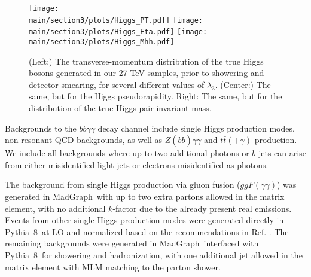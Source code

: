 \begin{figure}[h]
\centering
	\texttt{[image: \\main/section3/plots/Higgs\_PT.pdf]}
	\hfill
	\texttt{[image: \\main/section3/plots/Higgs\_Eta.pdf]}
	\hfill
	\texttt{[image: \\main/section3/plots/Higgs\_Mhh.pdf]}
\caption{(Left:) The transverse-momentum distribution of the true Higgs bosons generated in our 27 TeV samples, prior to showering and detector smearing, for several different values of $\lambda_3$. (Center:) The same, but for the Higgs pseudorapidity. Right: The same, but for the distribution of the true Higgs pair invariant mass.}\label{fig:dihiggs_kinematics}
\end{figure}

Backgrounds to the $b\bar{b}\gamma\gamma$ decay channel include single Higgs production modes, non-resonant QCD backgrounds, as well as $Z(b\bar{b})\gamma\gamma$ and $t\bar{t}(+\gamma)$ production. We include all backgrounds where up to two additional photons or $b$-jets can arise from either misidentified light jets or electrons misidentified as photons.

The background from single Higgs production via gluon fusion ($ggF(\gamma\gamma)$) was generated in {\sc\small MadGraph}\ with up to two extra partons allowed in the matrix element, with no additional $k$-factor due to the already present real emissions. Events from other single Higgs production modes were generated directly in {\sc\small Pythia~8}\ at LO and normalized based on the recommendations in Ref. \cite{deFlorian:2016spz}. The remaining backgrounds were generated in {\sc\small MadGraph}\ interfaced with {\sc\small Pythia~8}\ for showering and hadronization, with one additional jet allowed in the matrix element with MLM matching \cite{Mangano:2006rw, Alwall:2007fs} to the parton shower.

